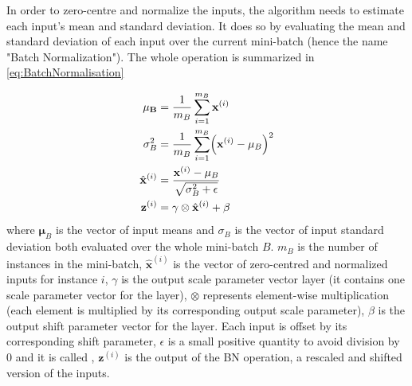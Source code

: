 In order to zero-centre and normalize the inputs, the algorithm needs to estimate each input's mean and standard deviation. It does so by evaluating the mean and standard deviation of each input over the current mini-batch (hence the name "Batch Normalization"). The whole operation is summarized in \autoref{eq:BatchNormalisation}

\begin{equation}
\begin{aligned}
\mathbf{\mu_B} &= \frac{1}{m_B} \sum_{i=1}^{m_B} \x^{(i)} \\
\mathbf{\sigma}_B^2 &= \frac{1}{m_B} \sum_{i=1}^{m_B} \br{\x^{(i)} - \mathbf{\mu}_B}^2\\
\hat{\mathbf{x}}^{(i)} &= \frac{\x^{(i)} - \mathbf{\mu}_B}{\sqrt{\mathbf{\sigma}_B^2 +\epsilon}}\\
\mathbf{z}^{(i)} &= \mathbf{\gamma} \otimes \hat{\mathbf{x}}^{(i)} + \mathbf{\beta}
\end{aligned}
\label{eq:BatchNormalisation}
\end{equation}
where $\mathbf{\mu}_B$ is the vector of input means and $\sigma_B$ is the vector of input standard deviation both evaluated over the whole mini-batch $B$. $m_B$ is the number of instances in the mini-batch, $\hat{\mathbf{x}}^{(i)}$ is the vector of zero-centred and normalized inputs for instance $i$, $\gamma$ is the output scale parameter vector layer (it contains one scale parameter vector for the layer), $\otimes$ represents element-wise multiplication (each element is multiplied by its corresponding output scale parameter), $\beta$ is the output shift parameter vector for the layer. Each input is offset by its corresponding shift parameter, $\epsilon$ is a small positive quantity to avoid division by $0$ and it is called , $\mathbf{z}^{(i)}$ is the output of the BN operation, a rescaled and shifted version of the inputs.

